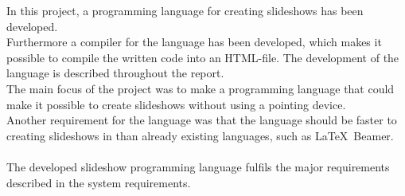 
In this project, a programming language for creating slideshows has been developed. \\
Furthermore a compiler for the language has been developed, which makes it possible to compile the written code into an HTML-file. The development of the language is described throughout the report. \\
The main focus of the project was to make a programming language that could make it possible to create slideshows without using a pointing device. \\
Another requirement for the language was that the language should be faster to creating slideshows in than already existing languages, such as \LaTeX~Beamer.
\\ \\
The developed slideshow programming language fulfils the major requirements described in the system requirements.